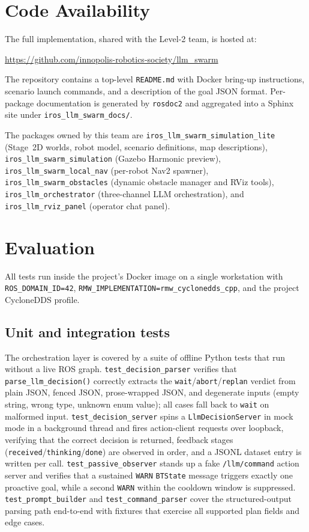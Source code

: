 \documentclass[conference]{IEEEtran}
\begin{document}
\section{Code Availability}
\label{sec:github}

The full implementation, shared with the Level-2 team, is
hosted at:
\begin{center}
\url{https://github.com/innopolis-robotics-society/llm_swarm}
\end{center}
The repository contains a top-level \texttt{README.md} with
Docker bring-up instructions, scenario launch commands, and a
description of the goal JSON format. Per-package documentation
is generated by \texttt{rosdoc2} and aggregated into a Sphinx
site under \texttt{iros\_llm\_swarm\_docs/}.

The packages owned by this team are
\texttt{iros\_llm\_swarm\_simulation\_lite} (Stage~2D worlds,
robot model, scenario definitions, map descriptions),
\texttt{iros\_llm\_swarm\_simulation} (Gazebo Harmonic
preview), \texttt{iros\_llm\_swarm\_local\_nav} (per-robot
Nav2 spawner), \texttt{iros\_llm\_swarm\_obstacles} (dynamic
obstacle manager and RViz tools), \texttt{iros\_llm\_orchestrator}
(three-channel LLM orchestration), and
\texttt{iros\_llm\_rviz\_panel} (operator chat panel).

\section{Evaluation}
\label{sec:exp}

All tests run inside the project's Docker image on a single
workstation with \texttt{ROS\_DOMAIN\_ID=42},
\texttt{RMW\_IMPLEMENTATION=rmw\_cyclonedds\_cpp}, and the
project CycloneDDS profile.

\subsection{Unit and integration tests}

The orchestration layer is covered by a suite of offline
Python tests that run without a live ROS graph.
\texttt{test\_decision\_parser} verifies that
\texttt{parse\_llm\_decision()} correctly extracts the
\texttt{wait}/\texttt{abort}/\texttt{replan} verdict from
plain JSON, fenced JSON, prose-wrapped JSON, and degenerate
inputs (empty string, wrong type, unknown enum value); all
cases fall back to \texttt{wait} on malformed input.
\texttt{test\_decision\_server} spins a
\texttt{LlmDecisionServer} in mock mode in a background thread
and fires action-client requests over loopback, verifying that
the correct decision is returned, feedback stages
(\texttt{received}/\texttt{thinking}/\texttt{done}) are
observed in order, and a JSONL dataset entry is written per
call. \texttt{test\_passive\_observer} stands up a fake
\texttt{/llm/command} action server and verifies that a
sustained \texttt{WARN} \texttt{BTState} message triggers
exactly one proactive goal, while a second \texttt{WARN}
within the cooldown window is suppressed.
\texttt{test\_prompt\_builder} and
\texttt{test\_command\_parser} cover the structured-output
parsing path end-to-end with fixtures that exercise all
supported plan fields and edge cases.
\end{document}
